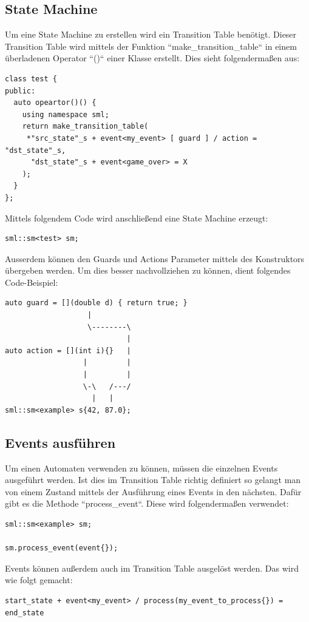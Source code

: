 \documentclass{report}
\begin{document}
\subsection{State Machine}
Um eine State Machine zu erstellen wird ein Transition Table benötigt. Dieser Transition Table wird mittels der Funktion ``make\_transition\_table`` in einem überladenen Operator ``()`` einer Klasse erstellt. Dies sieht folgendermaßen aus:
\begin{lstlisting}
class test {
public:
  auto opeartor()() {
    using namespace sml;
    return make_transition_table(
     *"src_state"_s + event<my_event> [ guard ] / action = "dst_state"_s,
      "dst_state"_s + event<game_over> = X
    );
  }
};
\end{lstlisting}
Mittels folgendem Code wird anschließend eine State Machine erzeugt:
\begin{lstlisting}
sml::sm<test> sm;
\end{lstlisting}
Ausserdem können den Guards und Actions Parameter mittels des Konstruktors übergeben werden. Um dies besser nachvollziehen zu können, dient folgendes Code-Beispiel:
\begin{lstlisting}
auto guard = [](double d) { return true; }
                   |
                   \--------\
                            |
auto action = [](int i){}   |
                  |         |
                  |         |
                  \-\   /---/
                    |   |
sml::sm<example> s{42, 87.0};
\end{lstlisting}

\subsection{Events ausführen}
Um einen Automaten verwenden zu können, müssen die einzelnen Events ausgeführt werden. Ist dies im Transition Table richtig definiert so gelangt man von einem Zustand mittels der Ausführung eines Events in den nächsten. Dafür gibt es die Methode ``process\_event``. Diese wird folgendermaßen verwendet:
\begin{lstlisting}
sml::sm<example> sm;

sm.process_event(event{});
\end{lstlisting}
Events können außerdem auch im Transition Table ausgelöst werden. Das wird wie folgt gemacht:
\begin{lstlisting}
start_state + event<my_event> / process(my_event_to_process{}) = end_state
\end{lstlisting}
\end{document}
